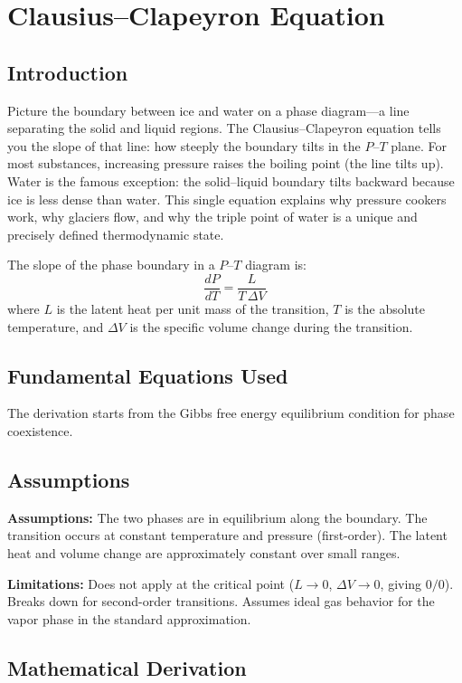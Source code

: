 \chapter{Clausius--Clapeyron Equation}

\section*{Introduction}

Picture the boundary between ice and water on a phase diagram---a line separating the solid and liquid regions. The Clausius--Clapeyron equation tells you the slope of that line: how steeply the boundary tilts in the $P$--$T$ plane. For most substances, increasing pressure raises the boiling point (the line tilts up). Water is the famous exception: the solid--liquid boundary tilts backward because ice is less dense than water. This single equation explains why pressure cookers work, why glaciers flow, and why the triple point of water is a unique and precisely defined thermodynamic state.


The slope of the phase boundary in a $P$--$T$ diagram is:
\[
\frac{dP}{dT} = \frac{L}{T\,\Delta V}
\]
where $L$ is the latent heat per unit mass of the transition, $T$ is the absolute temperature, and $\Delta V$ is the specific volume change during the transition.

\section*{Fundamental Equations Used}

The derivation starts from the Gibbs free energy equilibrium condition for phase coexistence.

\section*{Assumptions}

\textbf{Assumptions:} The two phases are in equilibrium along the boundary. The transition occurs at constant temperature and pressure (first-order). The latent heat and volume change are approximately constant over small ranges.


\textbf{Limitations:} Does not apply at the critical point ($L \to 0$, $\Delta V \to 0$, giving $0/0$). Breaks down for second-order transitions. Assumes ideal gas behavior for the vapor phase in the standard approximation.


\section*{Mathematical Derivation}

